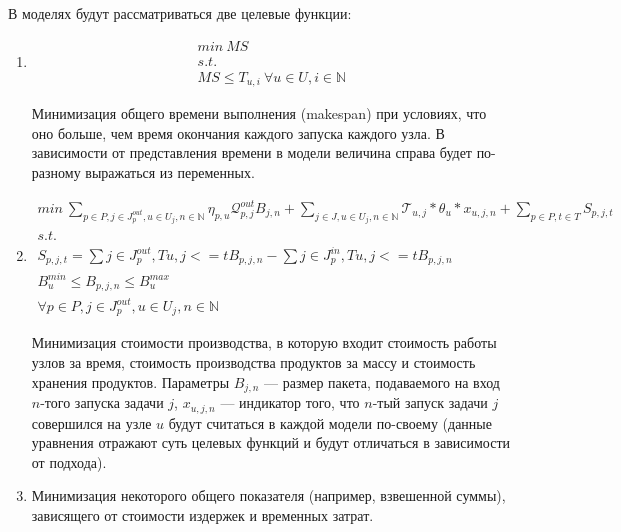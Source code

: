 \documentclass[12pt, twoside]{article}
\theoremstyle{definition}
\newcommand{\Tau}{\mathcal{T}}
\begin{document}
В моделях будут рассматриваться две целевые функции:
\begin{enumerate}
\item
\begin{equation}
\begin{gathered}
	min \: MS\\
	s.t.\\
	MS \leq T_{u, i} \: \forall u \in U, i \in \mathbb{N}
\end{gathered}
\end{equation}

Минимизация общего времени выполнения (makespan) при условиях, что оно больше, чем время окончания каждого запуска каждого узла. В зависимости от представления времени в модели величина справа будет по-разному выражаться из переменных.

\item 
\begin{equation}
\begin{gathered}
	min \: \displaystyle\sum_{p \in P, j \in J^{out}_p, u \in U_j, n \in \mathbb{N} }  \eta_{p, u} \mathcal{Q}^{out}_{p, j} B_{j, n} + \displaystyle\sum_{j \in J, u \in U_j, n \in \mathbb{N}} \Tau_{u, j}*\theta_{u}*x_{u, j, n} + \displaystyle\sum_{p \in P, t \in T} S_{p, j, t}\\
	s.t.\\
	S_{p, j, t} = \displaystyle\sum{j \in J^{out}_p, T{u, j} <= t}  B_{p, j, n} - \displaystyle\sum{j \in J^{in}_p, T{u, j} <= t}  B_{p, j, n}\\
	B^{min}_u \leq B_{p, j, n} \leq B^{max}_u \\
	 \forall p \in P, j \in J^{out}_p, u \in U_j, n \in \mathbb{N}
\end{gathered}
\end{equation}

Минимизация стоимости производства, в которую входит стоимость работы узлов за время, стоимость производства продуктов за массу и стоимость хранения продуктов. Параметры $B_{j, n}$ --- размер пакета, подаваемого на вход $n$-того запуска задачи $j$, $x_{u, j, n}$ --- индикатор того, что $n$-тый запуск задачи $j$ совершился на узле $u$ будут считаться в каждой модели по-своему (данные уравнения отражают суть целевых функций и будут отличаться в зависимости от подхода).


\item 
Минимизация некоторого общего показателя (например, взвешенной суммы), зависящего от стоимости издержек и временных затрат.

\end{enumerate}
\end{document}
